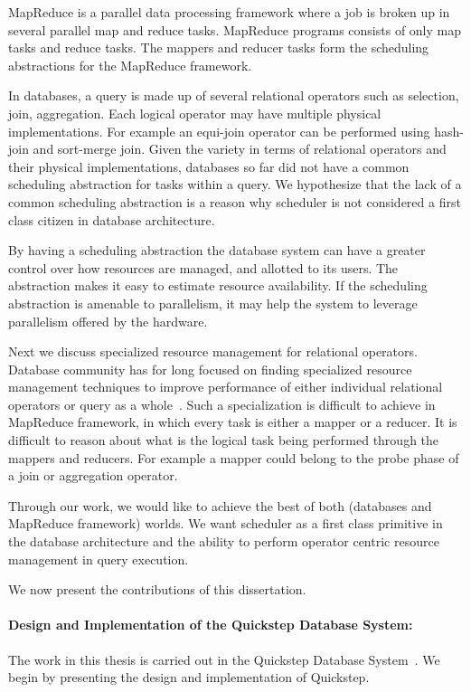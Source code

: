 MapReduce is a parallel data processing framework where a job is broken up in several parallel map and reduce tasks. 
MapReduce programs consists of only map tasks and reduce tasks.
The mappers and reducer tasks form the scheduling abstractions for the MapReduce framework.

In databases, a query is made up of several relational operators such as selection, join, aggregation. 
Each logical operator may have multiple physical implementations. 
For example an equi-join operator can be performed using hash-join and sort-merge join.
Given the variety in terms of relational operators and their physical implementations, databases so far did not have a common scheduling abstraction for tasks within a query. 
We hypothesize that the lack of a common scheduling abstraction is a reason why scheduler is not considered a first class citizen in database architecture.

By having a scheduling abstraction the database system can have a greater control over how resources are managed, and allotted to its users.
The abstraction makes it easy to estimate resource availability.
If the scheduling abstraction is amenable to parallelism, it may help the system to leverage parallelism offered by the hardware. 

Next we discuss specialized resource management for relational operators. 
Database community has for long focused on finding specialized resource management techniques to improve performance of either individual relational operators or query as a whole~\cite{davison1995dynamic, Bouganim:1998:MSL:288627.288646, memory-hash-ibm, mehta1993dynamic, DBLP:conf/cikm/NagD98}.
Such a specialization is difficult to achieve in MapReduce framework, in which every task is either a mapper or a reducer.
It is difficult to reason about what is the logical task being performed through the mappers and reducers. 
For example a mapper could belong to the probe phase of a join or aggregation operator. 

Through our work, we would like to achieve the best of both (databases and MapReduce framework) worlds.
We want scheduler as a first class primitive in the database architecture and the ability to perform operator centric resource management in query execution. 

We now present the contributions of this dissertation. 

\paragraph{Design and Implementation of the Quickstep Database System:}
The work in this thesis is carried out in the Quickstep Database System~\cite{quickstep-vldb, patel1quickstep, Quickstep}.
We begin by presenting the design and implementation of Quickstep.

